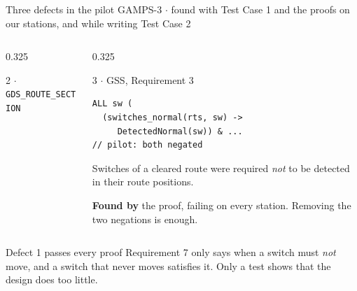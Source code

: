 \documentclass[aspectratio=169,10pt]{beamer}
\newcommand{\smallfont}{\fontsize{7}{8.6}\selectfont}
\begin{document}
\begin{frame}[fragile,label=sec_debug]{Three defects in the pilot GA}{MPS-3 $\cdot$ found with Test Case 1 and the proofs on our stations, and while writing Test Case 2}
\begin{columns}[T]
\begin{column}{0.325\textwidth}
\begin{proverbox}[equal height group=defects]{2 $\cdot$ \texttt{GDS\_ROUTE\_SECTION}}
      \end{proverbox}
    \end{column}
    \begin{column}{0.325\textwidth}
      \begin{proverbox}[equal height group=defects]{3 $\cdot$ GSS, Requirement 3}
        \begin{codebox}
\begin{lstlisting}[basicstyle=\fontsize{6.2}{7.4}\ttfamily]
ALL sw (
  (switches_normal(rts, sw) ->
     DetectedNormal(sw)) & ...
// pilot: both negated
\end{lstlisting}
        \end{codebox}
        \smallfont
        Switches of a cleared route were required \emph{not} to be detected in their route positions.\par
        \vspace{1mm}
        \textbf{Found by} the proof, failing on every station. Removing the two negations is enough.
      \end{proverbox}
    \end{column}
  \end{columns}

  \vspace{0.4mm}
  \begin{alertbox}[top=0.7mm,bottom=0.7mm]{Defect 1 passes every proof}
    \smallfont
    Requirement 7 only says when a switch must \emph{not} move, and a switch that never moves satisfies it. Only a test shows that the design does too little.
  \end{alertbox}
\end{frame}
\end{document}
